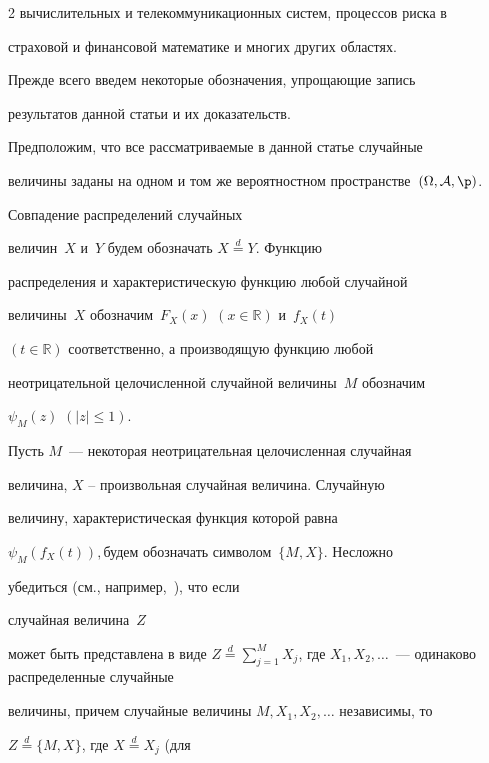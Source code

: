 \begin{multicols}{2}
вычислительных и телекоммуникационных систем, процессов риска в


страховой и финансовой математике и многих других областях.





Прежде всего введем некоторые обозначения, упрощающие запись


результатов данной статьи и их доказательств.





Предположим, что все рассматриваемые в данной статье случайные


величины заданы на одном и том же вероятностном пространстве~$(\Omega,\mathcal{A},\p)$. 


Сов\-па\-де\-ние распределений случайных


величин~$X$ и~$Y$ будем обозначать $X \stackrel{d}{=} Y$. Функцию


распределения и характеристическую функцию любой случайной


величины~$X$ обозначим~$F_X(x)$ $(x\in\mathbb{R})$ и~$f_X(t)$


$(t\in \mathbb{R})$ соответственно, а производящую функцию любой


неотрицательной целочисленной случайной величины~$M$ обозначим


$\psi_M(z)$ $(|z|\leqslant 1)$.





Пусть $M$~--- некоторая неотрицательная целочисленная случайная


величина, $X$ -- произвольная случайная величина. Случайную


величину, характеристическая функция которой равна


$\psi_M(f_X(t)),$\linebreak будем обозначать символом~$\{M,X\}$. Не\-слож\-но


убедиться (см., например,~\cite{1g}), что если %


случайная величина~$Z$ 


может быть представлена в \mbox{виде} $Z \stackrel{d}{=} \sum\limits_{j=1}^M


X_j$, где $X_1, X_2, \ldots$~--- одинаково распределенные случайные


величины, причем случайные величины $M, X_1, X_2, \ldots $ независимы, то


$Z\stackrel{d}{=}\{M,X\}$, где $X \stackrel{d}{=} X_j$ (для



\end{multicols}
